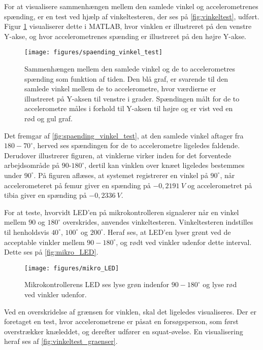 For at visualisere sammenhængen mellem den samlede vinkel og accelerometrenes spænding, er en test ved hjælp af vinkeltesteren, der ses på \autoref{fig:vinkeltest}, udført.  
Figur \ref{fig:spaending_vinkel_test} visualiserer dette i MATLAB, hvor vinklen er illustreret på den venstre Y-akse, og hvor accelerometrenes spænding er illustreret på den højre Y-akse.

\begin{figure}[H]
\centering
\texttt{[image: figures/spaending\_vinkel\_test]}
\caption{Sammenhængen mellem den samlede vinkel og de to accelerometres spænding som funktion af tiden. Den blå graf, er svarende til den samlede vinkel mellem de to accelerometre, hvor værdierne er illustreret på Y-aksen til venstre i grader. Spændingen målt for de to accelerometre måles i forhold til Y-aksen til højre og er vist ved en rød og gul graf.}
\label{fig:spaending_vinkel_test}
\end{figure}

\noindent
Det fremgar af \autoref{fig:spaending_vinkel_test}, at den samlede vinkel aftager fra $180-70^{\circ}$, herved ses spændingen for de to accelerometre ligeledes faldende.
Derudover illustrerer figuren, at vinklerne virker inden for det forventede arbejdsområde på $90$-$180^{\circ}$, dertil kan vinklen over knæet ligeledes bestemmes under $90^{\circ}$. 
På figuren aflæses, at systemet registrerer en vinkel på $90^{\circ}$, når  accelerometeret på femur giver en spænding på $-0,2191~V$ og accelerometret på tibia giver en spænding på $-0,2336~V$.


For at teste, hvorvidt LED'en på mikrokontrolleren signalerer når en vinkel mellem $90$ og $180^{\circ}$ overskrides, anvendes vinkeltesteren. Vinkeltesteren indstilles til henholdsvis $40^{\circ}$, $100^{\circ}$ og $200^{\circ}$. 
Heraf ses, at LED'en lyser grønt ved de acceptable vinkler mellem $90-180^{\circ}$, og rødt ved vinkler udenfor dette interval. Dette ses på \autoref{fig:mikro_LED}.

\begin{figure}[H]
\centering
\texttt{[image: figures/mikro\_LED]}
\caption{Mikrokontrollerens LED ses lyse grøn indenfor $90-180^{\circ}$ og lyse rød ved vinkler udenfor.}
\label{fig:mikro_LED}
\end{figure}

\noindent
Ved en overskridelse af grænsen for vinklen, skal det ligeledes visualiseres. 
Der er foretaget en test, hvor accelerometrene er påsat en forsøgsperson, som først overstrækker knæleddet, og derefter udfører en squat-øvelse. 
En visualisering heraf ses af \autoref{fig:vinkeltest_graenser}.

